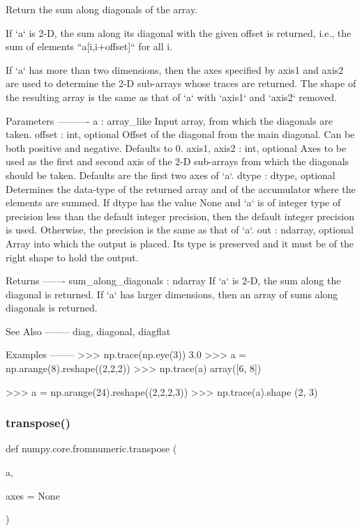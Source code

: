 \begin{DoxyVerb}Return the sum along diagonals of the array.

If `a` is 2-D, the sum along its diagonal with the given offset
is returned, i.e., the sum of elements ``a[i,i+offset]`` for all i.

If `a` has more than two dimensions, then the axes specified by axis1 and
axis2 are used to determine the 2-D sub-arrays whose traces are returned.
The shape of the resulting array is the same as that of `a` with `axis1`
and `axis2` removed.

Parameters
----------
a : array_like
    Input array, from which the diagonals are taken.
offset : int, optional
    Offset of the diagonal from the main diagonal. Can be both positive
    and negative. Defaults to 0.
axis1, axis2 : int, optional
    Axes to be used as the first and second axis of the 2-D sub-arrays
    from which the diagonals should be taken. Defaults are the first two
    axes of `a`.
dtype : dtype, optional
    Determines the data-type of the returned array and of the accumulator
    where the elements are summed. If dtype has the value None and `a` is
    of integer type of precision less than the default integer
    precision, then the default integer precision is used. Otherwise,
    the precision is the same as that of `a`.
out : ndarray, optional
    Array into which the output is placed. Its type is preserved and
    it must be of the right shape to hold the output.

Returns
-------
sum_along_diagonals : ndarray
    If `a` is 2-D, the sum along the diagonal is returned.  If `a` has
    larger dimensions, then an array of sums along diagonals is returned.

See Also
--------
diag, diagonal, diagflat

Examples
--------
>>> np.trace(np.eye(3))
3.0
>>> a = np.arange(8).reshape((2,2,2))
>>> np.trace(a)
array([6, 8])

>>> a = np.arange(24).reshape((2,2,2,3))
>>> np.trace(a).shape
(2, 3)\end{DoxyVerb}
 \mbox{\label{namespacenumpy_1_1core_1_1fromnumeric_aff97d74d47137201d26f209291f1f84a}} 
\subsubsection{\texorpdfstring{transpose()}{transpose()}}
{\footnotesize\ttfamily def numpy.\+core.\+fromnumeric.\+transpose (\begin{DoxyParamCaption}\item[{}]{a,  }\item[{}]{axes = {\ttfamily None} }\end{DoxyParamCaption})}

